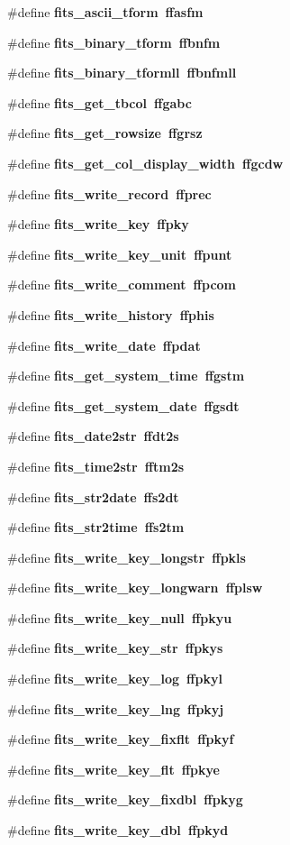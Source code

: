 \begin{CompactItemize}
\#define \bf{fits\_\-ascii\_\-tform}~ffasfm
\item 
\#define \bf{fits\_\-binary\_\-tform}~ffbnfm
\item 
\#define \bf{fits\_\-binary\_\-tformll}~ffbnfmll
\item 
\#define \bf{fits\_\-get\_\-tbcol}~ffgabc
\item 
\#define \bf{fits\_\-get\_\-rowsize}~ffgrsz
\item 
\#define \bf{fits\_\-get\_\-col\_\-display\_\-width}~ffgcdw
\item 
\#define \bf{fits\_\-write\_\-record}~ffprec
\item 
\#define \bf{fits\_\-write\_\-key}~ffpky
\item 
\#define \bf{fits\_\-write\_\-key\_\-unit}~ffpunt
\item 
\#define \bf{fits\_\-write\_\-comment}~ffpcom
\item 
\#define \bf{fits\_\-write\_\-history}~ffphis
\item 
\#define \bf{fits\_\-write\_\-date}~ffpdat
\item 
\#define \bf{fits\_\-get\_\-system\_\-time}~ffgstm
\item 
\#define \bf{fits\_\-get\_\-system\_\-date}~ffgsdt
\item 
\#define \bf{fits\_\-date2str}~ffdt2s
\item 
\#define \bf{fits\_\-time2str}~fftm2s
\item 
\#define \bf{fits\_\-str2date}~ffs2dt
\item 
\#define \bf{fits\_\-str2time}~ffs2tm
\item 
\#define \bf{fits\_\-write\_\-key\_\-longstr}~ffpkls
\item 
\#define \bf{fits\_\-write\_\-key\_\-longwarn}~ffplsw
\item 
\#define \bf{fits\_\-write\_\-key\_\-null}~ffpkyu
\item 
\#define \bf{fits\_\-write\_\-key\_\-str}~ffpkys
\item 
\#define \bf{fits\_\-write\_\-key\_\-log}~ffpkyl
\item 
\#define \bf{fits\_\-write\_\-key\_\-lng}~ffpkyj
\item 
\#define \bf{fits\_\-write\_\-key\_\-fixflt}~ffpkyf
\item 
\#define \bf{fits\_\-write\_\-key\_\-flt}~ffpkye
\item 
\#define \bf{fits\_\-write\_\-key\_\-fixdbl}~ffpkyg
\item 
\#define \bf{fits\_\-write\_\-key\_\-dbl}~ffpkyd
\item 

\end{CompactItemize}

